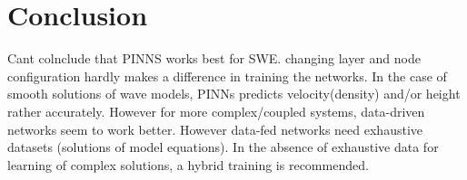 \section{Conclusion}
\label{sec:conclusion}
Cant colnclude that PINNS works best for SWE. changing layer and node configuration hardly makes a difference in training the networks. In the case of smooth solutions of wave models, PINNs predicts velocity(density) and/or height rather accurately. However for more complex/coupled systems, data-driven networks seem to work better. However data-fed networks need exhaustive datasets (solutions of model equations). In the absence of exhaustive data for learning of complex solutions, a hybrid training is recommended. 



